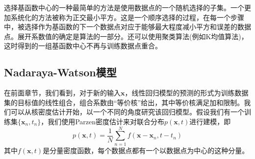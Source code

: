 选择基函数中心的一种最简单的方法是使用数据点的一个随机选择的子集。一个更加系统化的方法被称为正交最小平方。这是一个顺序选择的过程，在每一个步骤中，被选择作为基函数的下一个数据点对应于能够最大程度减小平方和误差的数据点。展开系数值的确定是算法的一部分。还可以使用聚类算法(例如K均值算法)，这时得到的一组基函数中心不再与训练数据点重合。

\subsection*{Nadaraya-Watson模型}
在前面章节，我们看到，对于新的输入$\boldsymbol{x}$，线性回归模型的预测的形式为训练数据集的目标值的线性组合，组合系数由“等价核”给出，其中等价核满足加和限制。我们可以从核密度估计开始，以一个不同的角度研究该回归模型。假设我们有一个训练集$\{\boldsymbol{x}_n,t_n \}$，我们使用Parzen密度估计来对联合分布$p(\boldsymbol{x},t)$进行建模，即
\begin{equation}
	p(\boldsymbol{x},t)=\frac{1}{N}\sum_{n=1}^{N}f(\boldsymbol{x}-\boldsymbol{x}_n,t-t_n)
\end{equation}
其中$f(\boldsymbol{x},t)$是分量密度函数，每个数据点都有一个以数据点为中心的这种分量。

